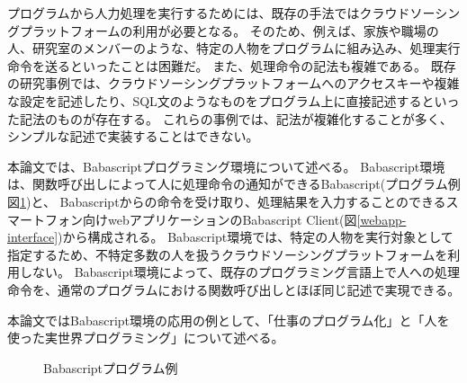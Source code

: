 \documentclass[twoside]{wiss}
\begin{document}
プログラムから人力処理を実行するためには、既存の手法ではクラウドソーシングプラットフォームの利用が必要となる。
そのため、例えば、家族や職場の人、研究室のメンバーのような、特定の人物をプログラムに組み込み、処理実行命令を送るといったことは困難だ。
また、処理命令の記法も複雑である。
既存の研究事例では、クラウドソーシングプラットフォームへのアクセスキーや複雑な設定を記述したり、SQL文のようなものをプログラム上に直接記述するといった記法のものが存在する。
これらの事例では、記法が複雑化することが多く、シンプルな記述で実装することはできない。

本論文では、Babascriptプログラミング環境について述べる。
Babascript環境は、関数呼び出しによって人に処理命令の通知ができるBabascript(プログラム例 図\ref{script_01})と、
Babascriptからの命令を受け取り、処理結果を入力することのできるスマートフォン向けwebアプリケーションのBabascript Client(図\ref{webapp-interface})から構成される。
Babascript環境では、特定の人物を実行対象として指定するため、不特定多数の人を扱うクラウドソーシングプラットフォームを利用しない。
Babascript環境によって、既存のプログラミング言語上で人への処理命令を、通常のプログラムにおける関数呼び出しとほぼ同じ記述で実現できる。

本論文ではBabascript環境の応用の例として、「仕事のプログラム化」と「人を使った実世界プログラミング」について述べる。


\begin{figure}[!h]  
  \centering
  \caption{Babascriptプログラム例}
  \label{script_01}
\end{figure}
\end{document}
